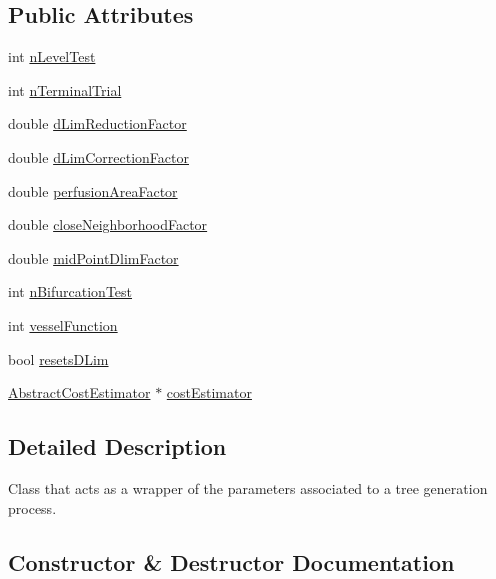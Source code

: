 \subsection*{Public Attributes}
\begin{DoxyCompactItemize}
\item 
int \hyperlink{class_generator_data_a124d5f0d59bdcd90fcd69b640d9af05f}{n\+Level\+Test}
\item 
int \hyperlink{class_generator_data_a0f4cff730a9b1fb2b237fc4610da2ff0}{n\+Terminal\+Trial}
\item 
double \hyperlink{class_generator_data_ace303215d8d8fc30af68e3c578806d80}{d\+Lim\+Reduction\+Factor}
\item 
double \hyperlink{class_generator_data_acebada3bce68b5fe40de8f043cee6885}{d\+Lim\+Correction\+Factor}
\item 
double \hyperlink{class_generator_data_acc6d373f481e41d082eb6f63786804e3}{perfusion\+Area\+Factor}
\item 
double \hyperlink{class_generator_data_aa7461e75da07157a1fafbc30a12dce03}{close\+Neighborhood\+Factor}
\item 
double \hyperlink{class_generator_data_a9241df122476b5e2449ce4542e5b0e68}{mid\+Point\+Dlim\+Factor}
\item 
int \hyperlink{class_generator_data_a3c848d7e7f5f26fdefe582709ca14eb4}{n\+Bifurcation\+Test}
\item 
int \hyperlink{class_generator_data_aaba3940733d99f383a09279694885dfd}{vessel\+Function}
\item 
bool \hyperlink{class_generator_data_ac246df2ff7ec145d0c33e3cfe105c82b}{resets\+D\+Lim}
\item 
\hyperlink{class_abstract_cost_estimator}{Abstract\+Cost\+Estimator} $\ast$ \hyperlink{class_generator_data_ae53d997a63beead78dfa9991776114d0}{cost\+Estimator}
\end{DoxyCompactItemize}


\subsection{Detailed Description}
Class that acts as a wrapper of the parameters associated to a tree generation process. 

\subsection{Constructor \& Destructor Documentation}
